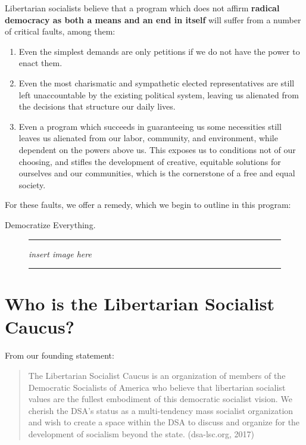 \documentclass[10pt]{memoir}
\begin{document}
\pagebreak
Libertarian socialists believe that a program which does not affirm \linebreak\textbf{radical democracy as both a means and an end in itself} will suffer from a number of critical faults, among them:
\begin{enumerate}
\item{Even the simplest demands are only petitions if we do not have the power to enact them.}
\item{Even the most charismatic and sympathetic elected representatives are still left unaccountable by the existing political system, leaving us alienated from the decisions that structure our daily lives.}
\item{Even a program which succeeds in guaranteeing us some necessities still leaves us alienated from our labor, community, and environment, while dependent on the powers above us. This exposes us to conditions not of our choosing, and stifles the development of creative, equitable solutions for ourselves and our communities, which is the cornerstone of a free and equal society.}
\end{enumerate}

For these faults, we offer a remedy, which we begin to outline in this program:

Democratize Everything. 


\begin{figure}[h!]
\hrule
\vspace{1in}
\center\huge\emph{insert image here}
\vspace{1in}

\hrule
\end{figure}
\vfill
\pagebreak
\section*{Who is the Libertarian Socialist Caucus?}
From our founding statement:
\begin{quote}
The Libertarian Socialist Caucus is an organization of members of the Democratic Socialists of America who believe that libertarian socialist values are the fullest embodiment of this democratic socialist vision. We cherish the DSA's status as a multi-tendency mass socialist organization and wish to create a space within the DSA to discuss and organize for the development of socialism beyond the state. (dsa-lsc.org, 2017)
\end{quote}
\end{document}
